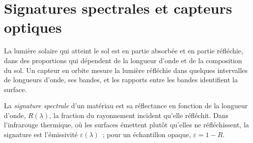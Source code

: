 \section{Signatures spectrales et capteurs optiques}\label{sec:b3:remote-sensing-gis:optical}

La lumière solaire qui atteint le sol est en partie absorbée et en partie réfléchie,
dans des proportions qui dépendent de la longueur d'onde et de la composition du sol.
Un capteur en orbite mesure la lumière réfléchie dans quelques intervalles de
longueurs d'onde, ses bandes, et les rapports entre les bandes identifient la
surface.

\begin{definition}\label{def:b3:remote-sensing-gis:signature}
La \emph{signature spectrale} d'un matériau est
sa réflectance en fonction de la longueur d'onde, $R(\lambda)$, la fraction du
rayonnement incident qu'elle réfléchit. Dans l'infrarouge thermique, où les
surfaces émettent plutôt qu'elles ne réfléchissent, la signature est l'émissivité
$\varepsilon(\lambda)$~; pour un échantillon opaque, $\varepsilon = 1 - R$.
\end{definition}

